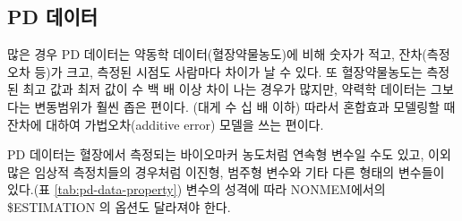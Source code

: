 \documentclass[
  10pt,
  krantz2,
  a4paper]{krantz}
\theoremstyle{definition}
\theoremstyle{definition}
\theoremstyle{definition}
\theoremstyle{remark}
\begin{document}
\hypertarget{pd-uxb370uxc774uxd130}{%
\subsection{PD 데이터}\label{pd-uxb370uxc774uxd130}}

많은 경우 PD 데이터는 약동학 데이터(혈장약물농도)에 비해 숫자가 적고, 잔차(측정오차 등)가 크고, 측정된 시점도 사람마다 차이가 날 수 있다. 또 혈장약물농도는 측정된 최고 값과 최저 값이 수 백 배 이상 차이 나는 경우가 많지만, 약력학 데이터는 그보다는 변동범위가 훨씬 좁은 편이다. (대게 수 십 배 이하) 따라서 혼합효과 모델링할 때 잔차에 대하여 가법오차(additive error) 모델을 쓰는 편이다.

PD 데이터는 혈장에서 측정되는 바이오마커 농도처럼 연속형 변수일 수도 있고, 이외 많은 임상적 측정치들의 경우처럼 이진형, 범주형 변수와 기타 다른 형태의 변수들이 있다.(표 \ref{tab:pd-data-property}) 변수의 성격에 따라 NONMEM에서의 \$ESTIMATION 의 옵션도 달라져야 한다.
\end{document}
